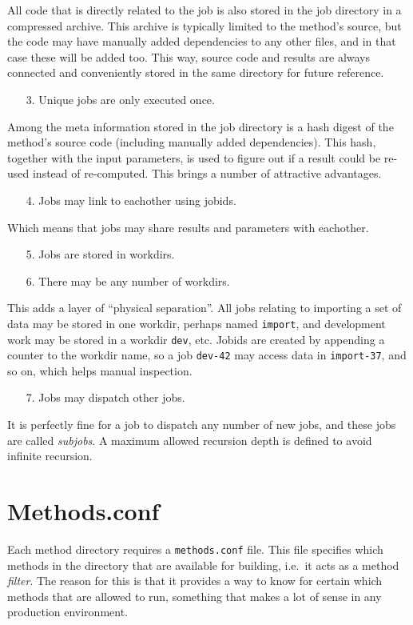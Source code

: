 All code that is directly related to the job is also stored in the job
directory in a compressed archive.  This archive is typically limited
to the method's source, but the code may have manually added
dependencies to any other files, and in that case these will be added
too.  This way, source code and results are always connected and
conveniently stored in the same directory for future reference.
\begin{itemize}
\item[3.]  Unique jobs are only executed once.
\end{itemize}
Among the meta information stored in the job directory is a hash
digest of the method's source code (including manually added
dependencies).  This hash, together with the input parameters, is used
to figure out if a result could be re-used instead of re-computed.
This brings a number of attractive advantages.
\begin{itemize}
\item[4.]  Jobs may link to eachother using jobids.
\end{itemize}
Which means that jobs may share results and parameters with eachother.
\begin{itemize}
\item[5.]  Jobs are stored in workdirs.
\item[6.]  There may be any number of workdirs.
\end{itemize}
This adds a layer of ``physical separation''.  All jobs relating to
importing a set of data may be stored in one workdir, perhaps named
\texttt{import}, and development work may be stored in a workdir
\texttt{dev}, etc.  Jobids are created by appending a counter to the
workdir name, so a job \texttt{dev-42} may access data in
\texttt{import-37}, and so on, which helps manual inspection.
\begin{itemize}
\item[7.] Jobs may dispatch other jobs.
\end{itemize}
It is perfectly fine for a job to dispatch any number of new jobs, and
these jobs are called \textsl{subjobs}.  A maximum allowed recursion
depth is defined to avoid infinite recursion.


\section{Methods.conf}
\label{sec:methods_conf}
Each method directory requires a \texttt{methods.conf} file.  This
file specifies which methods in the directory that are available for
building, i.e.\ it acts as a method \textsl{filter}.  The reason for
this is that it provides a way to know for certain which methods that
are allowed to run, something that makes a lot of sense in any
production environment.

